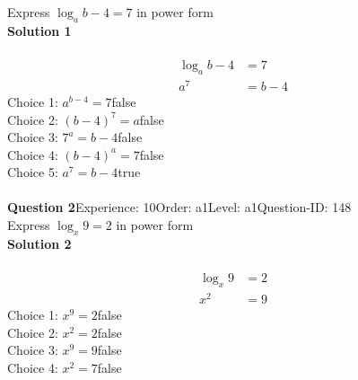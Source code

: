 \documentclass{article}
\begin{document}
Express $\log_{a}b-4=7$ in power form\\[4pt]
\noindent\textbf{Solution 1}\\[2pt]
\\[-35pt]\begin{align*}
\log_{a}b-4&=7\\[2pt]
a^7&=b-4
\end{align*}
Choice 1: \hspace{20pt}$a^{b-4}=7$\hspace{20pt}false\\
Choice 2: \hspace{20pt}$(b-4)^7=a$\hspace{20pt}false\\
Choice 3: \hspace{20pt}$7^a=b-4$\hspace{20pt}false\\
Choice 4: \hspace{20pt}$(b-4)^a=7$\hspace{20pt}false\\
Choice 5: \hspace{20pt}$a^7=b-4$\hspace{20pt}true\\
\\[4pt]
\noindent\textbf{Question 2}\hspace{20pt}Experience: 10\hspace{20pt}Order: a1\hspace{20pt}Level: a1\hspace{20pt}Question-ID: 148\\[2pt]
Express $\log_x9=2$ in power form\\[4pt]
\noindent\textbf{Solution 2}\\[2pt]
\\[-35pt]\begin{align*}
\log_x9&=2\\[2pt]
x^2&=9
\end{align*}
Choice 1: \hspace{20pt}$x^9=2$\hspace{20pt}false\\
Choice 2: \hspace{20pt}$x^2=2$\hspace{20pt}false\\
Choice 3: \hspace{20pt}$x^9=9$\hspace{20pt}false\\
Choice 4: \hspace{20pt}$x^2=7$\hspace{20pt}false\\
\end{document}
